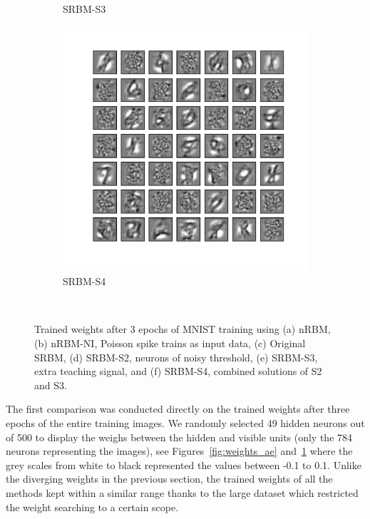 \begin{figure}
\begin{subfigure}[t]{0.4\textwidth}
		\caption{SRBM-S3}
	\end{subfigure}
	\begin{subfigure}[t]{0.4\textwidth}
		\includegraphics[width=\textwidth]{pics_sdlm/53_MNIST_SRBM_all/2_60000_0.pdf}
		\caption{SRBM-S4}
	\end{subfigure}\\
	\caption{Trained weights after 3 epochs of MNIST training using (a) nRBM, (b) nRBM-NI, Poisson spike trains as input data, (c) Original SRBM, (d) SRBM-S2, neurons of noisy threshold, (e) SRBM-S3, extra teaching signal, and (f) SRBM-S4, combined solutions of S2 and S3.}
	\label{fig:weights_rbm}
\end{figure}

The first comparison was conducted directly on the trained weights after three epochs of the entire training images.
We randomly selected 49 hidden neurons out of 500 to display the weighs between the hidden and visible units (only the 784 neurons representing the images), see Figures~\ref{fig:weights_ae} and~\ref{fig:weights_rbm} where the grey scales from white to black represented the values between -0.1 to 0.1.
Unlike the diverging weights in the previous section, the trained weights of all the methods kept within a similar range thanks to the large dataset which restricted the weight searching to a certain scope.  



